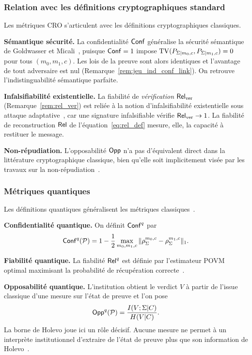 \begin{sloppypar}
\subsubsection{Relation avec les d\'efinitions cryptographiques standard}
\label{subsubsec:relation_crypto}

Les m\'etriques CRO s'articulent avec les d\'efinitions cryptographiques classiques.

\textbf{S\'emantique s\'ecurit\'e.} La confidentialit\'e $\mathsf{Conf}$ g\'en\'eralise la s\'ecurit\'e s\'emantique de Goldwasser et Micali~\cite{GoldwasserMicali84}, puisque $\mathsf{Conf} = 1$ impose $\operatorname{TV}(P_{\Sigma|m_0,c},P_{\Sigma|m_1,c}) = 0$ pour tous $(m_0,m_1,c)$. Les lois de la preuve sont alors identiques et l'avantage de tout adversaire est nul (Remarque~\ref{rem:jeu_ind_conf_link}). On retrouve l'indistinguabilit\'e s\'emantique parfaite.

\textbf{Infalsifiabilit\'e existentielle.} La fiabilit\'e de \emph{v\'erification} $\mathsf{Rel}_{\mathrm{ver}}$ (Remarque~\ref{rem:rel_ver}) est reli\'ee \`a la notion d'infalsifiabilit\'e existentielle sous attaque adaptative~\cite{GMR88}, car une signature infalsifiable v\'erifie $\mathsf{Rel}_{\mathrm{ver}} \to 1$. La fiabilit\'e de reconstruction $\mathsf{Rel}$ de l'\'equation~\eqref{eq:rel_def} mesure, elle, la capacit\'e \`a restituer le message.

\textbf{Non-r\'epudiation.} L'opposabilit\'e $\mathsf{Opp}$ n'a pas d'\'equivalent direct dans la litt\'erature cryptographique classique, bien qu'elle soit implicitement vis\'ee par les travaux sur la non-r\'epudiation~\cite{ZhouGollmann}.

\subsubsection{M\'etriques quantiques}
\label{subsubsec:metriques_quantiques}

Les d\'efinitions quantiques g\'en\'eralisent les m\'etriques classiques~\cite{Watrous2009,Boneh2011}.

\textbf{Confidentialit\'e quantique.} On d\'efinit $\mathsf{Conf}^q$ par
\begin{equation}
\mathsf{Conf}^q(\mathcal{P}) = 1 - \frac{1}{2}\max_{m_0,m_1,c}
\|\rho_\Sigma^{m_0,c} - \rho_\Sigma^{m_1,c}\|_1.
\label{eq:conf_q_def}
\end{equation}

\textbf{Fiabilit\'e quantique.} La fiabilit\'e $\mathsf{Rel}^q$ est d\'efinie par l'estimateur POVM optimal
maximisant la probabilit\'e de r\'ecup\'eration correcte~\cite{Wilde2017}.

\textbf{Opposabilit\'e quantique.} L'institution obtient le verdict $V$
\`a partir de l'issue classique d'une mesure sur l'\'etat de preuve et l'on pose
\begin{equation}
\mathsf{Opp}^q(\mathcal{P}) = \frac{I(V;\Sigma|C)}{H(V|C)}.
\label{eq:opp_q_def}
\end{equation}
La borne de Holevo joue ici un r\^ole d\'ecisif. Aucune mesure ne permet \`a un interpr\`ete
institutionnel d'extraire de l'\'etat de preuve plus que son information de
Holevo~\cite{Holevo1973}.
\end{sloppypar}

